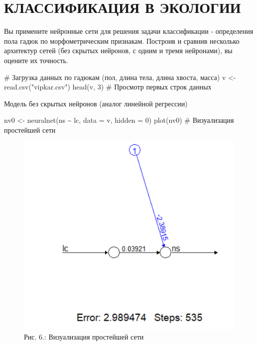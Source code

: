 \documentclass[
  letterpaper,
  DIV=11,
  numbers=noendperiod]{scrreprt}
\newenvironment{Shaded}{\begin{snugshade}}{\end{snugshade}}
\newcommand{\AttributeTok}[1]{\textcolor[rgb]{0.40,0.45,0.13}{#1}}
\newcommand{\CommentTok}[1]{\textcolor[rgb]{0.37,0.37,0.37}{#1}}
\newcommand{\DecValTok}[1]{\textcolor[rgb]{0.68,0.00,0.00}{#1}}
\newcommand{\FunctionTok}[1]{\textcolor[rgb]{0.28,0.35,0.67}{#1}}
\newcommand{\NormalTok}[1]{\textcolor[rgb]{0.00,0.23,0.31}{#1}}
\newcommand{\OtherTok}[1]{\textcolor[rgb]{0.00,0.23,0.31}{#1}}
\newcommand{\SpecialCharTok}[1]{\textcolor[rgb]{0.37,0.37,0.37}{#1}}
\newcommand{\StringTok}[1]{\textcolor[rgb]{0.13,0.47,0.30}{#1}}
\begin{document}
\section{КЛАССИФИКАЦИЯ В
ЭКОЛОГИИ}\label{ux43aux43bux430ux441ux441ux438ux444ux438ux43aux430ux446ux438ux44f-ux432-ux44dux43aux43eux43bux43eux433ux438ux438}

Вы примените нейронные сети для решения задачи классификации -
определения пола гадюк по морфометрическим признакам. Построив и сравнив
несколько архитектур сетей (без скрытых нейронов, с одним и тремя
нейронами), вы оцените их точность.

\begin{Shaded}
\begin{Highlighting}[]
\CommentTok{\# Загрузка данных по гадюкам (пол, длина тела, длина хвоста, масса)}
\NormalTok{v }\OtherTok{\textless{}{-}} \FunctionTok{read.csv}\NormalTok{(}\StringTok{"vipkar.csv"}\NormalTok{)}
\FunctionTok{head}\NormalTok{(v, }\DecValTok{3}\NormalTok{)  }\CommentTok{\# Просмотр первых строк данных}
\end{Highlighting}
\end{Shaded}

Модель без скрытых нейронов (аналог линейной регрессии)

\begin{Shaded}
\begin{Highlighting}[]
\NormalTok{nv0 }\OtherTok{\textless{}{-}} \FunctionTok{neuralnet}\NormalTok{(ns }\SpecialCharTok{\textasciitilde{}}\NormalTok{ lc, }\AttributeTok{data =}\NormalTok{ v, }\AttributeTok{hidden =} \DecValTok{0}\NormalTok{)}
\FunctionTok{plot}\NormalTok{(nv0)  }\CommentTok{\# Визуализация простейшей сети}
\end{Highlighting}
\end{Shaded}

\begin{figure}[H]

{\centering \includegraphics[width=0.4\linewidth,height=\textheight,keepaspectratio]{images/KOROSOV6.PNG}

}

\caption{Рис. 6.: Визуализация простейшей сети}

\end{figure}%
\end{document}

